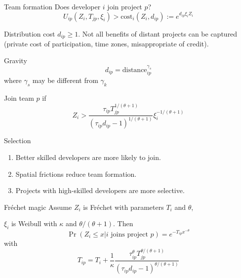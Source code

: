 \documentclass[
  ignorenonframetext,
  aspectratio=169,
]{beamer}
\providecommand{\tightlist}{%
  \setlength{\itemsep}{0pt}\setlength{\parskip}{0pt}}
\begin{document}
\begin{frame}{Team formation}
\protect\hypertarget{team-formation}{}
Does developer \(i\) join project \(p\)? \[
U_{ip}(Z_i, T_{jp}, \xi_i) > \text{cost}_{i}(Z_i, d_{ip}) := e^{d_{ip}\xi_i Z_i}
\]

\begin{block}{Distribution cost}
\protect\hypertarget{distribution-cost}{}
\(d_{ip} \ge 1\). Not all benefits of distant projects can be captured
(private cost of participation, time zones, misappropriate of credit).
\end{block}

\begin{block}{Gravity}
\protect\hypertarget{gravity-1}{}
\[
d_{ip} = \text{distance}_{ip}^{\gamma_s} 
\] where \(\gamma_s\) may be different from \(\gamma_k\)
\end{block}
\end{frame}

\begin{frame}{Join team \(p\) if}
\protect\hypertarget{join-team-p-if}{}
\[
Z_i > \frac{\tau_{ip} T_{jp}^{1/(\theta+1)} }
{(\tau_{ip} d_{ip} - 1)^{1/(\theta+1)}} 
\xi_i^{-1/(\theta+1)}
\]

\begin{block}{Selection}
\protect\hypertarget{selection}{}
\begin{enumerate}
\tightlist
\item
  Better skilled developers are more likely to join.
\item
  Spatial frictions reduce team formation.
\item
  Projects with high-skilled developers are more selective.
\end{enumerate}
\end{block}
\end{frame}

\begin{frame}{Fréchet magic}
\protect\hypertarget{fruxe9chet-magic}{}
Assume \(Z_i\) is Fréchet with parameters \(T_i\) and \(\theta\),

\(\xi_i\) is Weibull with \(\kappa\) and \(\theta/(\theta+1)\). Then \[
\Pr(Z_i \le x | i\text{ joins project }p) = e^{-T_{ip}x^{-\theta}}
\] with \[
T_{ip} = T_i + \frac1\kappa \frac{\tau_{ip}^\theta T_{jp}^{\theta/(\theta+1)} }
{(\tau_{ip} d_{ip} - 1)^{\theta/(\theta+1)}}
\]
\end{frame}
\end{document}
